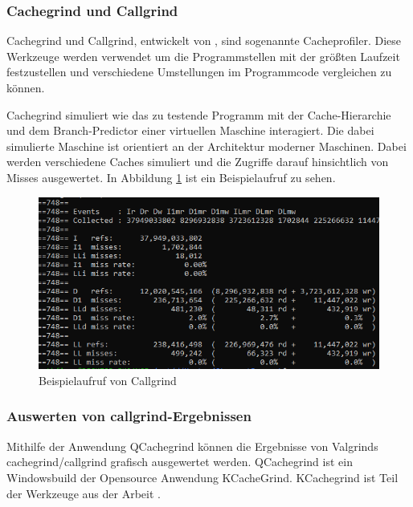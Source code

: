 \subsubsection{Cachegrind und Callgrind}

Cachegrind und Callgrind, entwickelt von \citeauthor{Weidendorfer2004ATS} \cite{Weidendorfer2004ATS}, sind sogenannte Cacheprofiler. 
Diese Werkzeuge werden verwendet um die Programmstellen mit der größten Laufzeit festzustellen und verschiedene Umstellungen im Programmcode vergleichen zu können.

Cachegrind simuliert wie das zu testende Programm mit der Cache-Hierarchie und dem Branch-Predictor einer virtuellen Maschine interagiert. Die dabei simulierte Maschine ist orientiert an der Architektur moderner Maschinen.
Dabei werden verschiedene Caches simuliert und die Zugriffe darauf hinsichtlich von Misses ausgewertet. In Abbildung \ref{callgrind} ist ein Beispielaufruf zu sehen.
 

\begin{figure}
  \includegraphics{images/callgrind.png}
  \caption{Beispielaufruf von Callgrind}\label{callgrind}
\end{figure}


\subsubsection{Auswerten von callgrind-Ergebnissen}


Mithilfe der Anwendung QCachegrind können die Ergebnisse von Valgrinds cachegrind/callgrind grafisch ausgewertet werden. QCachegrind ist ein Windowsbuild der Opensource Anwendung KCacheGrind.
KCachegrind ist Teil der Werkzeuge aus der Arbeit \cite{Weidendorfer2004ATS}.

